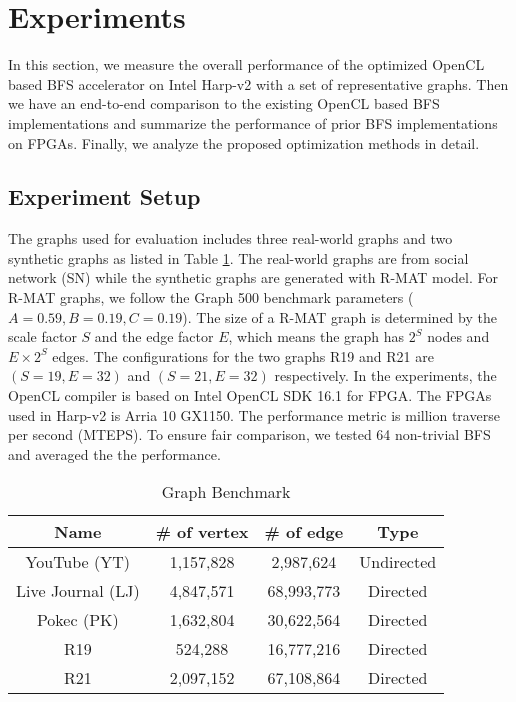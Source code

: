 \section{Experiments} \label{sec:experiment}
In this section, we measure the overall performance of the optimized 
OpenCL based BFS accelerator on Intel Harp-v2 
\cite{gupta2016accelerating} with a set of representative 
graphs. Then we have an end-to-end comparison to the existing OpenCL 
based BFS implementations and summarize the performance of prior BFS 
implementations on FPGAs. Finally, we analyze the proposed optimization 
methods in detail.

\subsection{Experiment Setup}
The graphs used for evaluation includes three real-world graphs and 
two synthetic graphs as listed in Table \ref{tab:graph}. The real-world 
graphs are from social network (SN) 
\cite{yang2012defining, leskovec2009community, takac2012data} while 
the synthetic graphs are generated with R-MAT model. For R-MAT graphs, 
we follow the Graph 500 benchmark parameters ($A=0.59, B=0.19, C=0.19$). 
The size of a R-MAT graph is determined by the scale 
factor $S$ and the edge factor $E$, which means the graph has $2^{S}$ 
nodes and $E\times 2^{S}$ edges.
The configurations for the two graphs R19 and R21 are $(S=19, E=32)$ and $(S=21, E=32)$ 
respectively. 
In the experiments, the OpenCL compiler is based on Intel OpenCL SDK 16.1 for FPGA. 
The FPGAs used in Harp-v2 is Arria 10 GX1150\cite{gupta2016accelerating}. 
The performance metric is million traverse per second (MTEPS).
To ensure fair comparison, we tested 64 non-trivial BFS and 
averaged the the performance.  

\begin{table}
    \centering
  \caption{Graph Benchmark}
  \label{tab:graph}
  \begin{tabular}{cccc}
    \toprule
      Name & \# of vertex & \# of edge & Type \\
    \midrule
      YouTube (YT) \cite{yang2012defining} & 1,157,828 & 2,987,624 & Undirected \\
      Live Journal (LJ) \cite{leskovec2009community} & 4,847,571 & 68,993,773 & Directed \\
      Pokec (PK) \cite{takac2012data} & 1,632,804 & 30,622,564 & Directed \\
      R19 & 524,288 & 16,777,216 & Directed \\
      R21 & 2,097,152 & 67,108,864 & Directed \\
  \bottomrule
\end{tabular}
\vspace{-0.5em}
\end{table}

